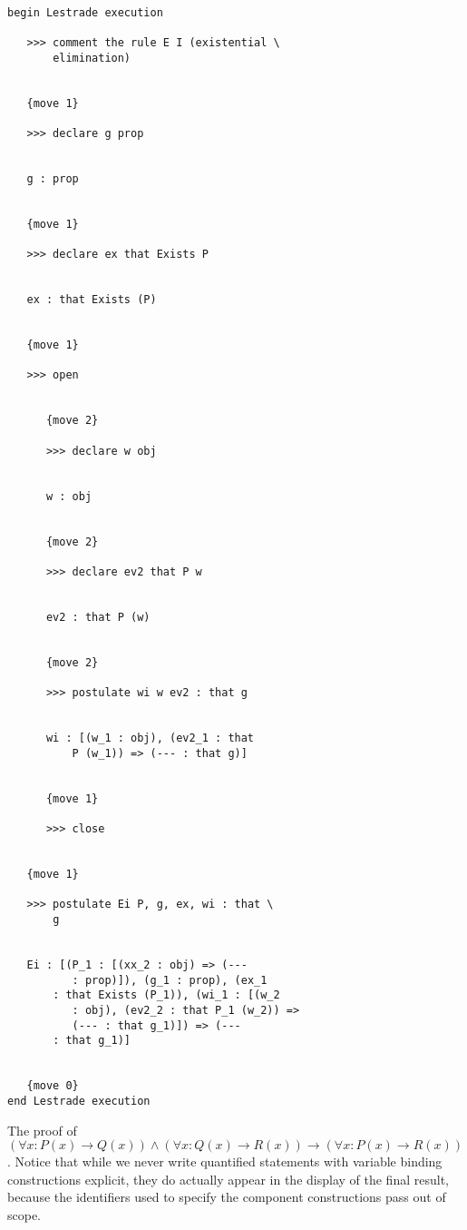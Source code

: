 \documentclass[12pt]{article}
\begin{document}
\begin{verbatim}

begin Lestrade execution

   >>> comment the rule E I (existential \
       elimination)


   {move 1}

   >>> declare g prop


   g : prop


   {move 1}

   >>> declare ex that Exists P


   ex : that Exists (P)


   {move 1}

   >>> open


      {move 2}

      >>> declare w obj


      w : obj


      {move 2}

      >>> declare ev2 that P w


      ev2 : that P (w)


      {move 2}

      >>> postulate wi w ev2 : that g


      wi : [(w_1 : obj), (ev2_1 : that 
          P (w_1)) => (--- : that g)]


      {move 1}

      >>> close


   {move 1}

   >>> postulate Ei P, g, ex, wi : that \
       g


   Ei : [(P_1 : [(xx_2 : obj) => (--- 
          : prop)]), (g_1 : prop), (ex_1 
       : that Exists (P_1)), (wi_1 : [(w_2 
          : obj), (ev2_2 : that P_1 (w_2)) => 
          (--- : that g_1)]) => (--- 
       : that g_1)]


   {move 0}
end Lestrade execution
\end{verbatim}

The proof of $(\forall x:P(x) \rightarrow Q(x)) \wedge (\forall x:Q(x) \rightarrow R(x)) \rightarrow (\forall x:P(x) \rightarrow R(x))$.  Notice that while we never write
quantified statements with  variable binding constructions explicit, they do actually appear in the display of the final result, because the identifiers used to specify the component constructions  pass out of scope.
\end{document}
